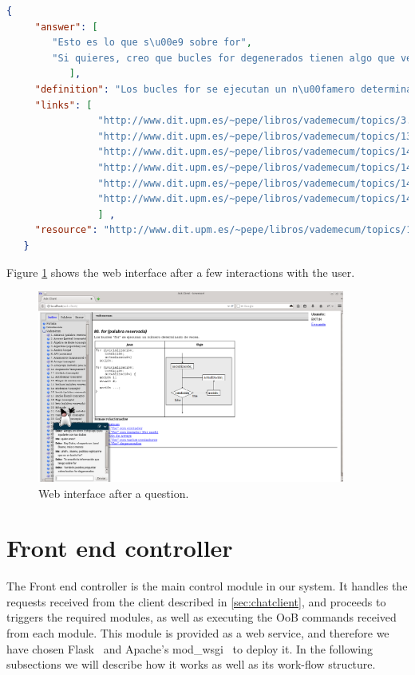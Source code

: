 \begin{center} 
  \begin{lstlisting}[language=json, caption=Example response for the chat client, label=listing:jsonchatresponse]
   {
     "answer": [
		"Esto es lo que s\u00e9 sobre for",
		"Si quieres, creo que bucles for degenerados tienen algo que ver con esto"
	       ],
     "definition": "Los bucles for se ejecutan un n\u00famero determinado de veces",
     "links": [
                "http://www.dit.upm.es/~pepe/libros/vademecum/topics/3.html",
                "http://www.dit.upm.es/~pepe/libros/vademecum/topics/139.html",
                "http://www.dit.upm.es/~pepe/libros/vademecum/topics/140.html",
                "http://www.dit.upm.es/~pepe/libros/vademecum/topics/141.html",
                "http://www.dit.upm.es/~pepe/libros/vademecum/topics/142.html",
                "http://www.dit.upm.es/~pepe/libros/vademecum/topics/143.html"
                ] ,
     "resource": "http://www.dit.upm.es/~pepe/libros/vademecum/topics/138.html"
   }  
  \end{lstlisting}
\end{center}

Figure \ref{fig:chat2} shows the web interface after a few interactions with the user.

\begin{figure}[!htbp]
    \centering
    \includegraphics[width=0.9\textwidth]{img/screens/ask-client-asked.png}
    \caption{Web interface after a question.}
    \label{fig:chat2}
\end{figure}

\section{Front end controller}
\label{sec:frontendcon}
The Front end controller is the main control module in our system. It handles the requests received from the client described in \ref{sec:chatclient}, and proceeds to triggers the required modules, as well as executing the \ac{OoB} commands received from each module. This module is provided as a web service, and therefore we have chosen Flask~\cite{flask0101} and Apache's mod\_wsgi~\cite{modwsgi} to deploy it. In the following subsections we will describe how it works as well as its work-flow structure.

